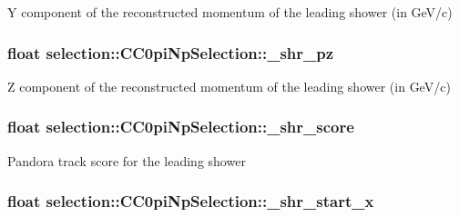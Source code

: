 Y component of the reconstructed momentum of the leading shower (in Ge\-V/c) \hypertarget{classselection_1_1CC0piNpSelection_a769319ad32b6ce49c7a5283b246303fa}{
\subsubsection[{\-\_\-shr\-\_\-pz}]{\setlength{\rightskip}{0pt plus 5cm}float selection\-::\-C\-C0pi\-Np\-Selection\-::\-\_\-shr\-\_\-pz\hspace{0.3cm}{\ttfamily [private]}}}\label{classselection_1_1CC0piNpSelection_a769319ad32b6ce49c7a5283b246303fa}
Z component of the reconstructed momentum of the leading shower (in Ge\-V/c) \hypertarget{classselection_1_1CC0piNpSelection_a9033ad097ef1b7a4e10b2b872b82f068}{
\subsubsection[{\-\_\-shr\-\_\-score}]{\setlength{\rightskip}{0pt plus 5cm}float selection\-::\-C\-C0pi\-Np\-Selection\-::\-\_\-shr\-\_\-score\hspace{0.3cm}{\ttfamily [private]}}}\label{classselection_1_1CC0piNpSelection_a9033ad097ef1b7a4e10b2b872b82f068}
Pandora track score for the leading shower \hypertarget{classselection_1_1CC0piNpSelection_ac0fb4dbd656f2f3fb2c12ffc02a0df7c}{
\subsubsection[{\-\_\-shr\-\_\-start\-\_\-x}]{\setlength{\rightskip}{0pt plus 5cm}float selection\-::\-C\-C0pi\-Np\-Selection\-::\-\_\-shr\-\_\-start\-\_\-x\hspace{0.3cm}{\ttfamily [private]}}}\label{classselection_1_1CC0piNpSelection_ac0fb4dbd656f2f3fb2c12ffc02a0df7c}
